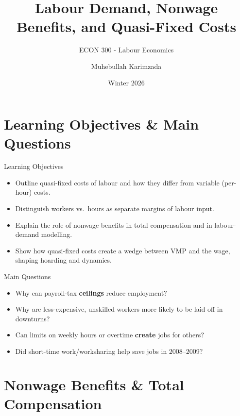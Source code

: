 \documentclass[aspectratio=169]{beamer}
\title{\textbf{Labour Demand, Nonwage Benefits, and Quasi-Fixed Costs \vspace{.5cm}\\  }}
\subtitle{ {\large ECON 300 - Labour Economics}}
\author{Muhebullah Karimzada}
\date{Winter 2026}
\begin{document}
\begin{frame}[plain]
  \titlepage
\end{frame}

\section{Learning Objectives \& Main Questions}

\begin{frame}{Learning Objectives}
\transfade
\begin{itemize}[<+->]
  \item Outline quasi-fixed costs of labour and how they differ from variable (per-hour) costs.
  \item Distinguish workers vs.\ hours as separate margins of labour input.
  \item Explain the role of nonwage benefits in total compensation and in labour-demand modelling.
  \item Show how quasi-fixed costs create a wedge between VMP and the wage, shaping hoarding and dynamics.
\end{itemize}
\end{frame}

\begin{frame}{Main Questions}
\transfade
\begin{itemize}[<+->]
  \item Why can payroll-tax \textbf{ceilings} reduce employment?
  \item Why are less-expensive, unskilled workers more likely to be laid off in downturns?
  \item Can limits on weekly hours or overtime \textbf{create} jobs for others?
  \item Did short-time work/worksharing help save jobs in 2008–2009?
\end{itemize}
\end{frame}

\section{Nonwage Benefits \& Total Compensation}
\end{document}
